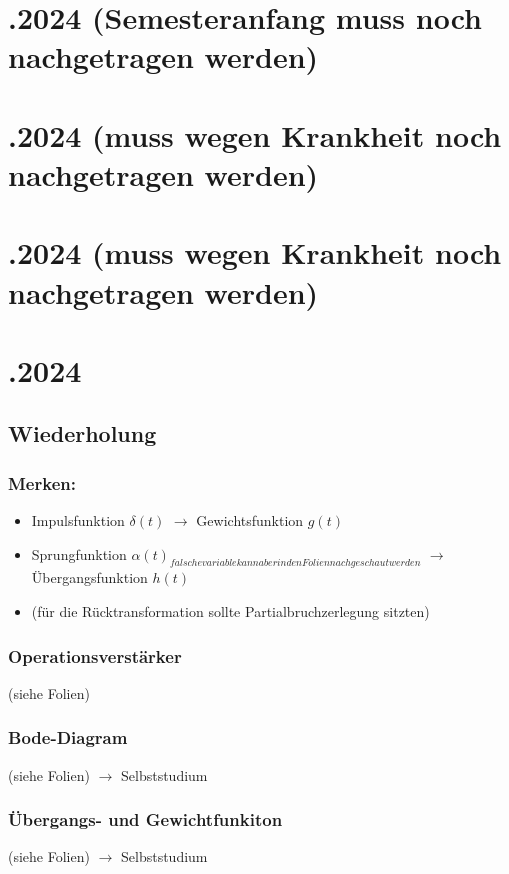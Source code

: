 \documentclass{article}
\begin{document}
\section*{.2024 (Semesteranfang muss noch nachgetragen werden)}


\newpage
\section*{.2024 (muss wegen Krankheit noch nachgetragen werden)}
\section*{.2024 (muss wegen Krankheit noch nachgetragen werden)}

\newpage
\section*{.2024}
\subsection*{Wiederholung}
\subsubsection*{Merken:}
\begin{itemize}
	\item Impulsfunktion $\delta (t)$ $\rightarrow$ Gewichtsfunktion $g(t)$
	\item Sprungfunktion $\alpha (t) _{falsche variable kann aber in den Folien nachgeschaut werden}$ $\rightarrow$ Übergangsfunktion $h(t)$
	\item (für die Rücktransformation sollte Partialbruchzerlegung sitzten)
\end{itemize}

\subsubsection*{Operationsverstärker}
(siehe Folien)

\subsubsection*{Bode-Diagram}
(siehe Folien) $\rightarrow$ Selbststudium

\subsubsection*{Übergangs- und Gewichtfunkiton}
(siehe Folien) $\rightarrow$ Selbststudium
\end{document}
